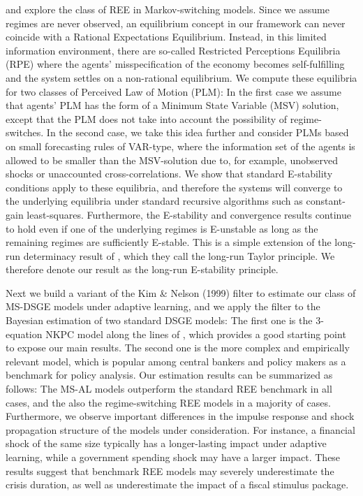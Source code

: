 \documentclass[12pt,reqno]{article}
\numberwithin{equation}{section}
\begin{document}
\cite{farmer2009understanding} and \cite{farmer2011minimal} explore the class of REE in Markov-switching models. Since we assume regimes are never observed, an equilibrium concept in our framework can never coincide with a Rational Expectations Equilibrium. Instead, in this limited information environment, there are so-called Restricted Perceptions Equilibria (RPE) where the agents' misspecification of the economy becomes self-fulfilling and the system settles on a non-rational equilibrium. We compute these equilibria for two classes of Perceived Law of Motion (PLM): In the first case we assume that agents' PLM has the form of a Minimum State Variable (MSV) solution, except that the PLM does not take into account the possibility of regime-switches. In the second case, we take this idea further and consider PLMs based on small forecasting rules of VAR-type, where the information set of the agents is allowed to be smaller than the MSV-solution due to, for example, unobserved shocks or unaccounted cross-correlations. We show that standard E-stability conditions apply to these equilibria, and therefore the systems will converge to the underlying equilibria under standard recursive algorithms such as constant-gain least-squares. Furthermore, the E-stability and convergence results continue to hold even if one of the underlying regimes is E-unstable as long as the remaining regimes are sufficiently E-stable. This is a simple extension of the long-run determinacy result of \cite{davig2007generalizing}, which they call the long-run Taylor principle. We therefore denote our result as the long-run E-stability principle.

Next we build a variant of the Kim \& Nelson (1999) filter to estimate our class of MS-DSGE models under adaptive learning, and we apply the filter to the Bayesian estimation of two standard DSGE models: The first one is the 3-equation NKPC model along the lines of \cite{woodford2013macroeconomic}, which provides a good starting point to expose our main results. The second one is the more complex and empirically relevant \cite{smets2007shocks} model, which is popular among central bankers and policy makers as a benchmark for policy analysis. Our estimation results can be summarized as follows: The MS-AL models outperform the standard REE benchmark in all cases, and the also the regime-switching REE models in a majority of cases. Furthermore, we observe important differences in the impulse response and shock propagation structure of the models under consideration. For instance, a financial shock of the same size typically has a longer-lasting impact under adaptive learning, while a government spending shock may have a larger impact. These results suggest that benchmark REE models may severely underestimate the crisis duration, as well as underestimate the impact of a fiscal stimulus package. 
\end{document}
